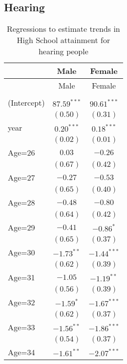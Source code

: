 \documentclass[fullpage]{paper}
\begin{document}
\subsection{ Hearing }

\begin{center}
\begin{longtable}{l c c }
\hline
 & Male & Female \\
\hline
\endfirsthead
\hline
 & Male & Female \\
\hline
\endhead
\hline
\endfoot
\hline
\multicolumn{3}{l}{\scriptsize{$^{***}p<0.001$, $^{**}p<0.01$, $^*p<0.05$}}\\
\caption{Regressions to estimate trends in High School attainment for hearing people}
\label{table:coefficients}
\endlastfoot
(Intercept) & $87.59^{***}$ & $90.61^{***}$ \\
            & $(0.50)$      & $(0.31)$      \\
year        & $0.20^{***}$  & $0.18^{***}$  \\
            & $(0.02)$      & $(0.01)$      \\
Age=26      & $0.03$        & $-0.26$       \\
            & $(0.67)$      & $(0.42)$      \\
Age=27      & $-0.27$       & $-0.53$       \\
            & $(0.65)$      & $(0.40)$      \\
Age=28      & $-0.48$       & $-0.80$       \\
            & $(0.64)$      & $(0.42)$      \\
Age=29      & $-0.41$       & $-0.86^{*}$   \\
            & $(0.65)$      & $(0.37)$      \\
Age=30      & $-1.73^{**}$  & $-1.44^{***}$ \\
            & $(0.62)$      & $(0.39)$      \\
Age=31      & $-1.05$       & $-1.19^{**}$  \\
            & $(0.56)$      & $(0.39)$      \\
Age=32      & $-1.59^{*}$   & $-1.67^{***}$ \\
            & $(0.62)$      & $(0.37)$      \\
Age=33      & $-1.56^{**}$  & $-1.86^{***}$ \\
            & $(0.54)$      & $(0.37)$      \\
Age=34      & $-1.61^{**}$  & $-2.07^{***}$ \\

\end{longtable}
\end{center}
\end{document}
